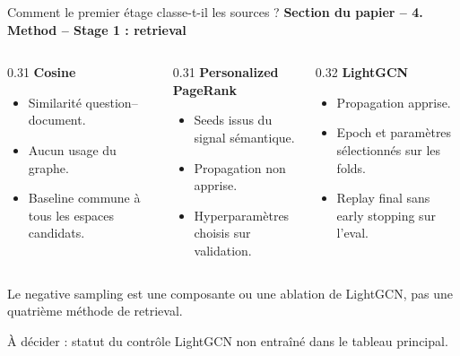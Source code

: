 \documentclass[aspectratio=169,10pt]{beamer}
\newcommand{\keybox}[1]{%
  \begin{center}
  \colorbox{accentsoft}{\parbox{0.92\linewidth}{\centering #1}}
  \end{center}}
\newcommand{\decisionbox}[1]{%
  \begin{center}
  \colorbox{orange!14}{\parbox{0.92\linewidth}{\centering\color{warning} #1}}
  \end{center}}
\newcommand{\papersection}[1]{%
  {\scriptsize\textcolor{accent}{\textbf{Section du papier -- #1}}}\par\vspace{0.55em}}
\begin{document}
\begin{frame}{Comment le premier étage classe-t-il les sources ?}
  \papersection{4. Method -- Stage 1 : retrieval}
  \footnotesize
  \begin{columns}[T,onlytextwidth]
    \begin{column}{0.31\textwidth}
      \textbf{\color{accent}Cosine}
      \begin{itemize}\setlength{\itemsep}{0.3em}
        \item Similarité question--document.
        \item Aucun usage du graphe.
        \item Baseline commune à tous les espaces candidats.
      \end{itemize}
    \end{column}
    \begin{column}{0.31\textwidth}
      \textbf{\color{ok}Personalized PageRank}
      \begin{itemize}\setlength{\itemsep}{0.3em}
        \item Seeds issus du signal sémantique.
        \item Propagation non apprise.
        \item Hyperparamètres choisis sur validation.
      \end{itemize}
    \end{column}
    \begin{column}{0.32\textwidth}
      \textbf{\color{crosscol}LightGCN}
      \begin{itemize}\setlength{\itemsep}{0.3em}
        \item Propagation apprise.
        \item Epoch et paramètres sélectionnés sur les folds.
        \item Replay final sans early stopping sur l'eval.
      \end{itemize}
    \end{column}
  \end{columns}

  \vspace{0.9em}
  \keybox{\scriptsize Le negative sampling est une composante ou une ablation de LightGCN,
  pas une quatrième méthode de retrieval.}

  \vspace{0.35em}
  \decisionbox{\scriptsize À décider : statut du contrôle LightGCN non entraîné
  dans le tableau principal.}
\end{frame}
\end{document}
